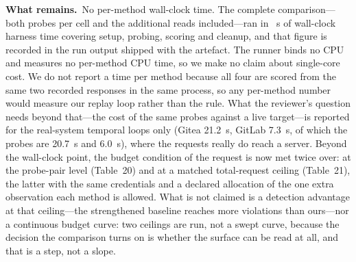 \documentclass[10pt,letterpaper]{article}
\newcommand{\Remains}[1]{\par\smallskip\noindent\textbf{What remains.}\ #1\par}
\begin{document}
\Remains{No per-method wall-clock time. The complete comparison---both probes per
cell and the additional reads included---ran in \BlRunSeconds{}~s of wall-clock
harness time covering setup, probing, scoring and cleanup, and that figure is
recorded in the run output shipped with the artefact. The runner binds no CPU and
measures no per-method CPU time, so we make no claim about single-core cost. We
do not report a time per method because all four are scored from the
same two recorded responses in the same process, so any per-method number would
measure our replay loop rather than the rule. What the reviewer's question needs
beyond that---the cost of the same probes against a live target---is reported for
the real-system temporal loops only (Gitea 21.2~s, GitLab 7.3~s, of which the
probes are 20.7~s and 6.0~s), where the requests really do reach a server.
Beyond the wall-clock point, the budget condition of the request is now met twice
over: at the probe-pair level (Table~20) and at a matched total-request ceiling
(Table~21), the latter with the same credentials and a declared allocation of the
one extra observation each method is allowed. What is not claimed is a detection
advantage at that ceiling---the strengthened baseline reaches more violations
than ours---nor a continuous budget curve: two ceilings are run, not a swept
curve, because the decision the comparison turns on is whether the surface can be
read at all, and that is a step, not a slope.}
\end{document}
